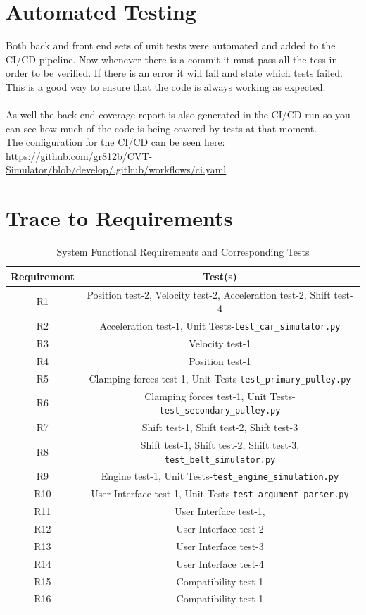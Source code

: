 \documentclass[12pt, titlepage]{article}
\begin{document}
\section{Automated Testing}
Both back and front end sets of unit tests were automated and added to the CI/CD pipeline. Now whenever there is a commit it must pass all the tess in order to be verified.
If there is an error it will fail and state which tests failed. This is a good way to ensure that the code is always working as expected.\\
\\
As well the back end coverage report is also generated in the CI/CD run so you can see how much of the code is being covered by tests at that moment.
\\
The configuration for the CI/CD can be seen here: \url{https://github.com/gr812b/CVT-Simulator/blob/develop/.github/workflows/ci.yaml}
\section{Trace to Requirements}

\begin{table}[H]
  \centering
    \begin{tabular}{|c|c|}
      \hline
      \textbf{Requirement} & \textbf{Test(s)} \\ \hline
      R1 & Position test-2, Velocity test-2, Acceleration test-2, Shift test-4  \\ \hline
      R2 & Acceleration test-1, Unit Tests-\texttt{test\_car\_simulator.py} \\ \hline
      R3 & Velocity test-1 \\ \hline
      R4 & Position test-1 \\ \hline
      R5 & Clamping forces test-1, Unit Tests-\texttt{test\_primary\_pulley.py} \\ \hline
      R6 & Clamping forces test-1, Unit Tests-\texttt{test\_secondary\_pulley.py} \\ \hline
      R7 & Shift test-1, Shift test-2, Shift test-3 \\ \hline
      R8 & Shift test-1, Shift test-2, Shift test-3, \texttt{test\_belt\_simulator.py}  \\ \hline
      R9 & Engine test-1, Unit Tests-\texttt{test\_engine\_simulation.py} \\ \hline
      R10 & User Interface test-1, Unit Tests-\texttt{test\_argument\_parser.py}  \\ \hline
      R11 & User Interface test-1, \\ \hline
      R12 & User Interface test-2 \\ \hline
      R13 & User Interface test-3 \\ \hline
      R14 & User Interface test-4 \\ \hline
      R15 & Compatibility test-1 \\ \hline
      R16 & Compatibility test-1 \\ \hline
      \end{tabular}
      \caption{System Functional Requirements and Corresponding Tests}
      \label{tab:requirements_tests}
  \end{table}
\end{document}
